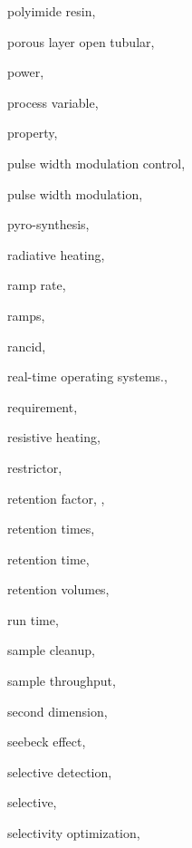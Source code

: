 \begin{theindex}
  \item \lowercase {polyimide resin}, 
  \item \lowercase {porous layer open tubular}, 
  \item \lowercase {power}, 
  \item \lowercase {process variable}, 
  \item \lowercase {property}, 
  \item \lowercase {pulse width modulation control}, 
  \item \lowercase {pulse width modulation}, 
  \item \lowercase {pyro-synthesis}, 
  \item \lowercase {radiative heating}, 
  \item \lowercase {ramp rate}, 
  \item \lowercase {ramps}, 
  \item \lowercase {rancid}, 
  \item \lowercase {real-time operating systems.}, 
  \item \lowercase {requirement}, 
  \item \lowercase {resistive heating}, 
  \item \lowercase {restrictor}, 
  \item \lowercase {retention factor}, , 
  \item \lowercase {retention times}, 
  \item \lowercase {retention time}, 
  \item \lowercase {retention volumes}, 
  \item \lowercase {run time}, 
  \item \lowercase {sample cleanup}, 
  \item \lowercase {sample throughput}, 
  \item \lowercase {second dimension}, 
  \item \lowercase {Seebeck effect}, 
  \item \lowercase {selective detection}, 
  \item \lowercase {selective}, 
  \item \lowercase {selectivity optimization}, 

\end{theindex}
